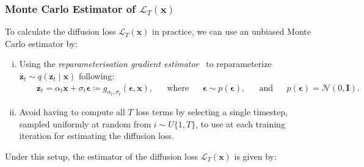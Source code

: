 \subsubsection{Monte Carlo Estimator of $\mathcal{L}_T(\mathbf{x})$}
%
To calculate the diffusion loss $\mathcal{L}_T(\mathbf{x})$ in practice, we can use an unbiased Monte Carlo estimator by: 
\begin{enumerate}[(i)]
    \item Using the \textit{reparameterisation gradient estimator}~\citep{kingma2013auto,rezende2014stochastic} to reparameterize $\mathbf{z}_t \sim q(\mathbf{z}_t \mid \mathbf{x})$ following:
    \begin{align}
        &&\mathbf{z}_t = \alpha_t \mathbf{x} + \sigma_t \boldsymbol{\epsilon} \coloneqq g_{\alpha_t,\sigma_t}(\boldsymbol{\epsilon}, \mathbf{x}),&& \text{where} &&\boldsymbol{\epsilon} \sim p(\boldsymbol{\epsilon}), &&\text{and} &&p(\boldsymbol{\epsilon}) = \mathcal{N}(0, \mathbf{I}).&&
    \end{align}
    \item Avoid having to compute all $T$ loss terms by selecting a single timestep, sampled uniformly at random from $i \sim U\{1,T\}$, to use at each training iteration for estimating the diffusion loss.
\end{enumerate}
%
Under this setup, the estimator of the diffusion loss $\mathcal{L}_T(\mathbf{x})$ is given by:
%
